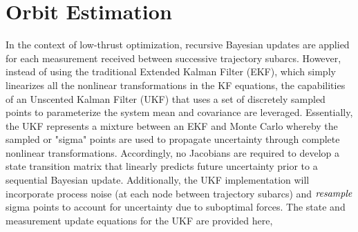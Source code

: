 \documentclass[a4paper]{article}
\renewcommand\vec{\mathbf}	%
\begin{document}


\section{Orbit Estimation}
In the context of low-thrust optimization, recursive Bayesian updates are applied for each measurement received between successive trajectory subarcs. However, instead of using the traditional Extended Kalman Filter (EKF), which simply linearizes all the nonlinear transformations in the KF equations, the capabilities of an Unscented Kalman Filter (UKF) that uses a set of discretely sampled points to parameterize the system mean and covariance are leveraged. Essentially, the UKF represents a mixture between an EKF and Monte Carlo whereby the sampled or "sigma" points are used to propagate uncertainty through complete nonlinear transformations. Accordingly, no Jacobians are required to develop a state transition matrix that linearly predicts future uncertainty prior to a sequential Bayesian update. Additionally, the UKF implementation will incorporate process noise (at each node between trajectory subarcs) and $\it resample$ sigma points to account for uncertainty due to suboptimal forces.  The state and measurement update equations for the UKF are provided here, \\
\end{document}
